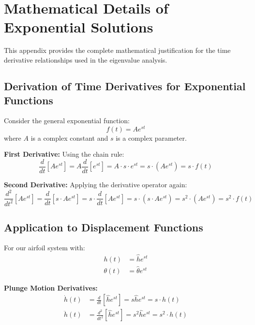 \documentclass{article}
\begin{document}
\newpage
\section{Mathematical Details of Exponential Solutions}

This appendix provides the complete mathematical justification for the time derivative relationships used in the eigenvalue analysis.

\subsection{Derivation of Time Derivatives for Exponential Functions}

Consider the general exponential function:
\begin{equation}
f(t) = A e^{st}
\label{eq:exponential_general}
\end{equation}
where $A$ is a complex constant and $s$ is a complex parameter.

\textbf{First Derivative:}
Using the chain rule:
\begin{equation}
\frac{d}{dt}[A e^{st}] = A \frac{d}{dt}[e^{st}] = A \cdot s \cdot e^{st} = s \cdot (A e^{st}) = s \cdot f(t)
\label{eq:first_derivative}
\end{equation}

\textbf{Second Derivative:}
Applying the derivative operator again:
\begin{equation}
\frac{d^2}{dt^2}[A e^{st}] = \frac{d}{dt}[s \cdot A e^{st}] = s \cdot \frac{d}{dt}[A e^{st}] = s \cdot (s \cdot A e^{st}) = s^2 \cdot (A e^{st}) = s^2 \cdot f(t)
\label{eq:second_derivative}
\end{equation}

\subsection{Application to Displacement Functions}

For our airfoil system with:
\begin{align}
h(t) &= \hat{h} e^{st} \\
\theta(t) &= \hat{\theta} e^{st}
\end{align}

\textbf{Plunge Motion Derivatives:}
\begin{align}
\dot{h}(t) &= \frac{d}{dt}[\hat{h} e^{st}] = s \hat{h} e^{st} = s \cdot h(t) \\
\ddot{h}(t) &= \frac{d^2}{dt^2}[\hat{h} e^{st}] = s^2 \hat{h} e^{st} = s^2 \cdot h(t)
\end{align}
\end{document}
